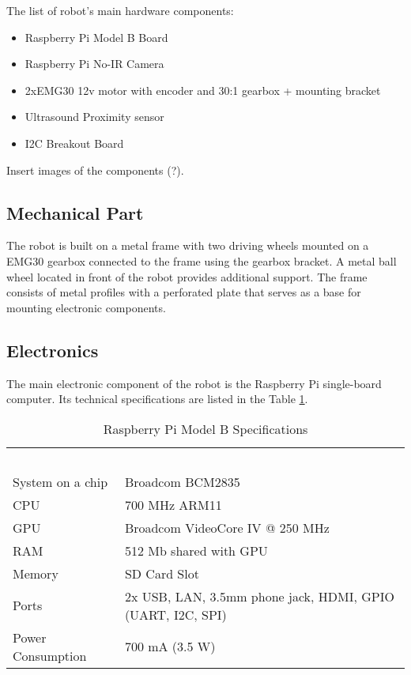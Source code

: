 The list of robot's main hardware components:

\begin{itemize}
  \item Raspberry Pi Model B Board
  \item Raspberry Pi No-IR Camera
  \item 2xEMG30 12v motor with encoder and 30:1 gearbox + mounting bracket
  \item Ultrasound Proximity sensor
  \item I2C Breakout Board
\end{itemize}

Insert images of the components (?).

\subsection*{Mechanical Part}

The robot is built on a metal frame with two driving wheels mounted on a EMG30
gearbox connected to the frame using the gearbox bracket. A metal ball wheel
located in front of the robot provides additional support. The frame consists of
metal profiles with a perforated plate that serves as a base for mounting
electronic components.

\subsection*{Electronics}

The main electronic component of the robot is the Raspberry Pi single-board
computer. Its technical specifications are listed in the Table
\ref{tab:rpi_specs}.

\begin{table}[h!]
	\setlength\extrarowheight{2pt}
    \begin{tabularx}{\textwidth}{XX}
    
    ~                 & ~                                                           \\
    System on a chip  & Broadcom BCM2835                                            \\
    CPU               & 700 MHz ARM11                                               \\
    GPU               & Broadcom VideoCore IV @ 250 MHz                             \\
    RAM               & 512 Mb shared with GPU                                      \\
    Memory            & SD Card Slot                                                \\
    Ports             & 2x USB, LAN, 3.5mm phone jack, HDMI,  GPIO (UART, I2C, SPI) \\
    Power Consumption & 700 mA (3.5 W)                                              \\
    
    \end{tabularx}
    \caption{Raspberry Pi Model B Specifications}
    \label{tab:rpi_specs}
\end{table}


